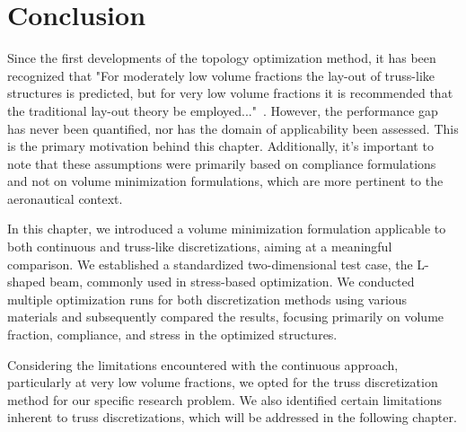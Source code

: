 \section{Conclusion}
Since the first developments of the topology optimization method, it has been recognized that "For moderately low volume fractions the lay-out of truss-like structures is predicted, but for very low volume fractions it is recommended that the traditional lay-out theory be employed..."~. However, the performance gap has never been quantified, nor has the domain of applicability been assessed. This is the primary motivation behind this chapter. Additionally, it's important to note that these assumptions were primarily based on compliance formulations and not on volume minimization formulations, which are more pertinent to the aeronautical context.

In this chapter, we introduced a volume minimization formulation applicable to both continuous and truss-like discretizations, aiming at a meaningful comparison. We established a standardized two-dimensional test case, the L-shaped beam, commonly used in stress-based optimization. We conducted multiple optimization runs for both discretization methods using various materials and subsequently compared the results, focusing primarily on volume fraction, compliance, and stress in the optimized structures.

Considering the limitations encountered with the continuous approach, particularly at very low volume fractions, we opted for the truss discretization method for our specific research problem. We also identified certain limitations inherent to truss discretizations, which will be addressed in the following chapter.